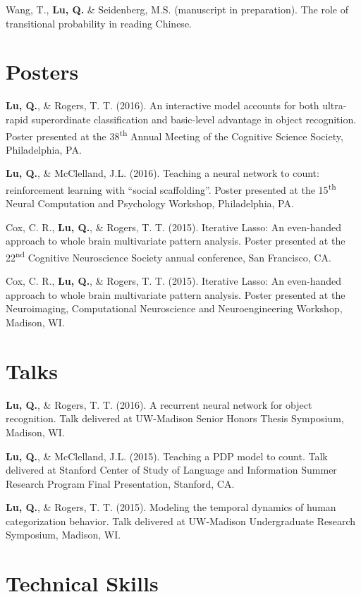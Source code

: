 \documentclass[11pt,a4paper,sans]{moderncv}        %
\newcommand{\ts}{\textsuperscript}
\begin{document}
\hangindent=0.7cm
Wang, T., \textbf{Lu, Q.} \& Seidenberg, M.S. (manuscript in preparation). The role of transitional probability in reading Chinese. 


\section{Posters}
\hangindent=0.7cm
\textbf{Lu, Q.}, \& Rogers, T. T. (2016). An interactive model accounts for both ultra-rapid superordinate classification and basic-level advantage in object recognition. Poster presented at the 38\ts{th} Annual Meeting of the Cognitive Science Society, Philadelphia, PA.

\hangindent=0.7cm
\textbf{Lu, Q.}, \& McClelland, J.L. (2016). Teaching a neural network to count: reinforcement learning with ``social scaffolding''. Poster presented at the 15\ts{th} Neural Computation and Psychology Workshop, Philadelphia, PA.

\hangindent=0.7cm
Cox, C. R., \textbf{Lu, Q.}, \& Rogers, T. T. (2015). Iterative Lasso: An even-handed approach to whole brain multivariate pattern analysis. Poster presented at the 22\ts{nd} Cognitive Neuroscience Society annual conference, San Francisco, CA.

\hangindent=0.7cm
Cox, C. R., \textbf{Lu, Q.}, \& Rogers, T. T. (2015). Iterative Lasso: An even-handed approach to whole brain multivariate pattern analysis. Poster presented at the Neuroimaging, Computational Neuroscience and Neuroengineering Workshop, Madison, WI.


\section{Talks}
\hangindent=0.7cm
\textbf{Lu, Q.}, \& Rogers, T. T. (2016). A recurrent neural network for object recognition. Talk delivered at UW-Madison Senior Honors Thesis Symposium, Madison, WI.

\hangindent=0.7cm
\textbf{Lu, Q.}, \& McClelland, J.L. (2015). Teaching a PDP model to count. Talk delivered at Stanford Center of Study of Language and Information Summer Research Program Final Presentation, Stanford, CA. 

\hangindent=0.7cm
\textbf{Lu, Q.}, \& Rogers, T. T. (2015). Modeling the temporal dynamics of human categorization behavior. Talk delivered at UW-Madison Undergraduate Research Symposium, Madison, WI.




\section{Technical Skills}
\end{document}
